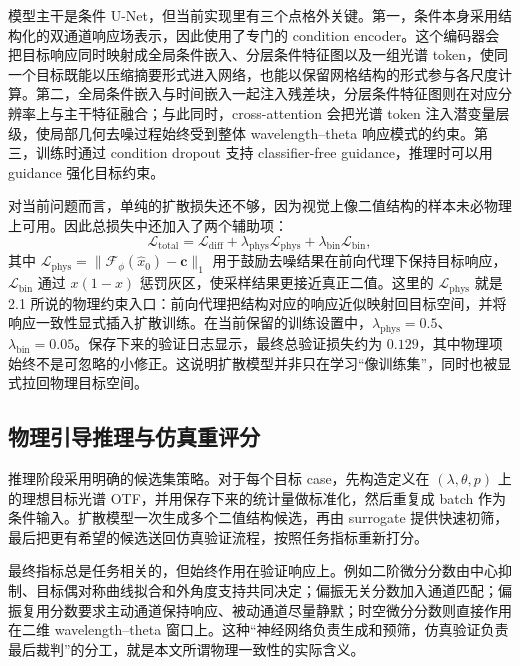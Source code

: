 模型主干是条件 U-Net，但当前实现里有三个点格外关键。第一，条件本身采用结构化的双通道响应场表示，因此使用了专门的 condition encoder。这个编码器会把目标响应同时映射成全局条件嵌入、分层条件特征图以及一组光谱 token，使同一个目标既能以压缩摘要形式进入网络，也能以保留网格结构的形式参与各尺度计算。第二，全局条件嵌入与时间嵌入一起注入残差块，分层条件特征图则在对应分辨率上与主干特征融合；与此同时，cross-attention 会把光谱 token 注入潜变量层级，使局部几何去噪过程始终受到整体 wavelength--theta 响应模式的约束。第三，训练时通过 condition dropout 支持 classifier-free guidance，推理时可以用 guidance 强化目标约束。

对当前问题而言，单纯的扩散损失还不够，因为视觉上像二值结构的样本未必物理上可用。因此总损失中还加入了两个辅助项：
\begin{equation}
\mathcal{L}_{\mathrm{total}}
=\mathcal{L}_{\mathrm{diff}}
+\lambda_{\mathrm{phys}}\mathcal{L}_{\mathrm{phys}}
+\lambda_{\mathrm{bin}}\mathcal{L}_{\mathrm{bin}},
\end{equation}
其中 $\mathcal{L}_{\mathrm{phys}}=\|\mathcal{F}_{\phi}(\widehat{x}_0)-\mathbf{c}\|_1$ 用于鼓励去噪结果在前向代理下保持目标响应，$\mathcal{L}_{\mathrm{bin}}$ 通过 $x(1-x)$ 惩罚灰区，使采样结果更接近真正二值。这里的 $\mathcal{L}_{\mathrm{phys}}$ 就是 2.1 所说的物理约束入口：前向代理把结构对应的响应近似映射回目标空间，并将响应一致性显式插入扩散训练。在当前保留的训练设置中，$\lambda_{\mathrm{phys}}=0.5$、$\lambda_{\mathrm{bin}}=0.05$。保存下来的验证日志显示，最终总验证损失约为 $0.129$，其中物理项始终不是可忽略的小修正。这说明扩散模型并非只在学习“像训练集”，同时也被显式拉回物理目标空间。

\subsection{物理引导推理与仿真重评分}

推理阶段采用明确的候选集策略。对于每个目标 case，先构造定义在 $(\lambda,\theta,p)$ 上的理想目标光谱 OTF，并用保存下来的统计量做标准化，然后重复成 batch 作为条件输入。扩散模型一次生成多个二值结构候选，再由 surrogate 提供快速初筛，最后把更有希望的候选送回仿真验证流程，按照任务指标重新打分。

最终指标总是任务相关的，但始终作用在验证响应上。例如二阶微分分数由中心抑制、目标偶对称曲线拟合和外角度支持共同决定；偏振无关分数加入通道匹配；偏振复用分数要求主动通道保持响应、被动通道尽量静默；时空微分分数则直接作用在二维 wavelength--theta 窗口上。这种“神经网络负责生成和预筛，仿真验证负责最后裁判”的分工，就是本文所谓物理一致性的实际含义。
